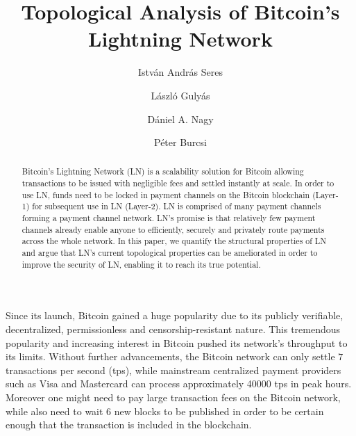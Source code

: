 \documentclass[runningheads]{llncs}
\begin{document}
%
\title{Topological Analysis of Bitcoin's Lightning Network}
%
%
\author{István András Seres \and
László Gulyás \and
Dániel A. Nagy \and
Péter Burcsi}
%
%
%
\maketitle              %
%
\begin{abstract}
Bitcoin's Lightning Network (LN) is a scalability solution for Bitcoin allowing transactions to be issued with negligible fees and settled instantly at scale. In order to use LN, funds need to be locked in payment channels on the Bitcoin blockchain (Layer-1) for subsequent use in LN (Layer-2). LN is comprised of many payment channels forming a payment channel network. LN's promise is that relatively few payment channels already enable anyone to efficiently, securely and privately route payments across the whole network. In this paper, we quantify the structural properties of LN and argue that LN's current topological properties can be ameliorated in order to improve the security of LN, enabling it to reach its true potential.

\end{abstract}
%
%
%
Since its launch, Bitcoin \cite{nakamoto2008bitcoin} gained a huge popularity due to its publicly verifiable, decentralized, permissionless and censorship-resistant nature. This tremendous popularity and increasing interest in Bitcoin pushed its network's throughput to its limits. Without further advancements, the Bitcoin network can only settle $7$ transactions per second (tps), while mainstream centralized payment providers such as Visa and Mastercard can process approximately \num[group-separator={,}]{40000} tps in peak hours. Moreover one might need to pay large transaction fees on the Bitcoin network, while also need to wait 6 new blocks to be published in order to be certain enough that the transaction is included in the blockchain.
\end{document}

